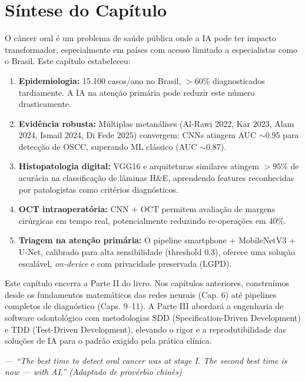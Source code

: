 

\section{Síntese do Capítulo}
\label{sec:sintese-11}

O câncer oral é um problema de saúde pública onde a IA pode ter impacto
transformador, especialmente em países com acesso limitado a especialistas
como o Brasil. Este capítulo estabeleceu:

\begin{enumerate}
  \item \textbf{Epidemiologia:} 15.100 casos/ano no Brasil, $> 60\%$ diagnosticados
        tardiamente. A IA na atenção primária pode reduzir este número drasticamente.

  \item \textbf{Evidência robusta:} Múltiplas metanálises (Al-Rawi 2022, Kar 2023,
        Alam 2024, Ismail 2024, Di Fede 2025) convergem: CNNs atingem AUC $\sim$0.95
        para detecção de OSCC, superando ML clássico (AUC $\sim$0.87).

  \item \textbf{Histopatologia digital:} VGG16 e arquiteturas similares atingem
        $> 95\%$ de acurácia na classificação de lâminas H\&E, aprendendo features
        reconhecidas por patologistas como critérios diagnósticos.

  \item \textbf{OCT intraoperatória:} CNN + OCT permitem avaliação de margens
        cirúrgicas em tempo real, potencialmente reduzindo re-operações em 40\%.

  \item \textbf{Triagem na atenção primária:} O pipeline smartphone + MobileNetV3
        + U-Net, calibrado para alta sensibilidade (threshold 0.3), oferece uma
        solução escalável, \textit{on-device} e com privacidade preservada (LGPD).
\end{enumerate}

Este capítulo encerra a Parte II do livro. Nos capítulos anteriores, construímos
desde os fundamentos matemáticos das redes neurais (Cap. 6) até pipelines completos
de diagnóstico (Caps. 9--11). A Parte III abordará a engenharia de software
odontológico com metodologias SDD (Specification-Driven Development) e TDD
(Test-Driven Development), elevando o rigor e a reprodutibilidade das soluções
de IA para o padrão exigido pela prática clínica.

\begin{flushright}
\itshape\small
--- ``The best time to detect oral cancer was at stage I. The second best time
is now --- with AI.'' (Adaptado de provérbio chinês)
\end{flushright}

